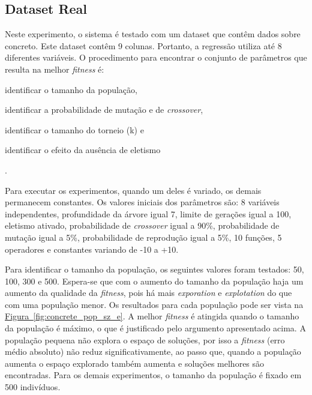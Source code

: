 \documentclass[a4paper]{article}
\begin{document}
\subsection{Dataset Real}
Neste experimento, o sistema é testado com um dataset que contêm dados sobre
concreto. Este dataset contêm 9 colunas. Portanto, a regressão utiliza até 8
diferentes variáveis. O procedimento para encontrar o conjunto de parâmetros que
resulta na melhor \textit{fitness} é: \begin{ilist} \item identificar o tamanho
  da população,
\item identificar a probabilidade de mutação e de \textit{crossover}, \item
  identificar o tamanho do torneio (k) e
  \item identificar o efeito da ausência de eletismo \end{ilist}.

Para executar os experimentos, quando um deles é variado, os demais permanecem
constantes. Os valores iniciais dos parâmetros são: 8 variáveis independentes,
profundidade da árvore igual 7, limite de gerações igual a 100, eletismo ativado,
probabilidade de \textit{crossover} igual a 90\%, probabilidade de mutação igual
a 5\%, probabilidade de reprodução igual a 5\%,
10 funções, 5 operadores e constantes variando de -10 a +10.

Para identificar o tamanho da população, os seguintes valores foram testados:
50, 100, 300 e 500. Espera-se que com o aumento do tamanho da população haja um
aumento da qualidade da \textit{fitness}, pois há mais \textit{exporation} e
\textit{explotation} do que com uma população menor. Os resultados para cada
população pode ser vista na
\hyperref[fig:concrete_pop_sz_e]{Figura~\ref*{fig:concrete_pop_sz_e}}. A melhor
\textit{fitness} é atingida quando o tamanho da população é máximo, o que é
justificado pelo argumento apresentado acima. A população pequena não explora o
espaço de soluções, por isso a \textit{fitness} (erro médio absoluto) não reduz
significativamente, ao passo que, quando a população aumenta o espaço explorado
também aumenta e soluções melhores são encontradas. Para os demais experimentos,
o tamanho da população é fixado em 500 indivíduos.
\end{document}
